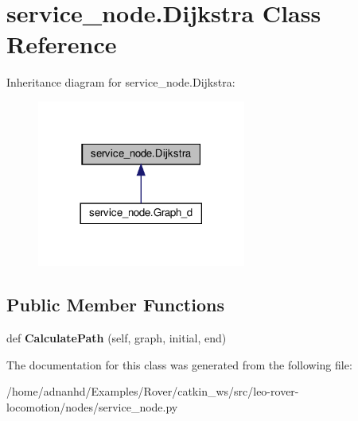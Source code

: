 \hypertarget{classservice__node_1_1Dijkstra}{}\section{service\+\_\+node.\+Dijkstra Class Reference}
\label{classservice__node_1_1Dijkstra}


Inheritance diagram for service\+\_\+node.\+Dijkstra\+:
\nopagebreak
\begin{figure}[H]
\begin{center}
\leavevmode
\includegraphics[width=194pt]{classservice__node_1_1Dijkstra__inherit__graph}
\end{center}
\end{figure}
\subsection*{Public Member Functions}
\begin{DoxyCompactItemize}
\item 
\mbox{\label{classservice__node_1_1Dijkstra_a6d1a519973491eca0cdd433a8140035d}} 
def {\bfseries Calculate\+Path} (self, graph, initial, end)
\end{DoxyCompactItemize}


The documentation for this class was generated from the following file\+:\begin{DoxyCompactItemize}
\item 
/home/adnanhd/\+Examples/\+Rover/catkin\+\_\+ws/src/leo-\/rover-\/locomotion/nodes/service\+\_\+node.\+py\end{DoxyCompactItemize}
